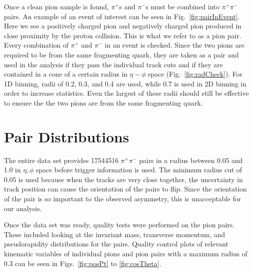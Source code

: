 \documentclass[letterpaper, abstract = on,listof=totoc, bibliography=totoc]{scrreprt}
\begin{document}

Once a clean pion sample is found, $\pi^+$s and $\pi^-$s must be combined into $\pi^+\pi^-$ pairs. An example of an event of interest can be seen in Fig.~\ref{fig:pairInEvent}. Here we see a positively charged pion and negatively charged pion produced in close proximity by the proton collision. This is what we refer to as a pion pair.  Every combination of $\pi^+$ and $\pi^-$ in an event is checked. Since the two pions are required to be from the same fragmenting quark, they are taken as a pair and used in the analysis if they pass the individual track cuts and if they are contained in a cone of a certain radius in $\eta-\phi$ space (Fig.~\ref{fig:radCheck}). For 1D binning, radii of 0.2, 0.3, and 0.4 are used, while 0.7 is used in 2D binning in order to increase statistics. Even the largest of these radii should still be effective to ensure the the two pions are from the same fragmenting quark.  


\FloatBarrier
\section{Pair Distributions}

The entire data set provides 17544516 $\pi^+\pi^-$ pairs in a radius between 0.05 and 1.0 in $\eta,\phi$ space before trigger information is used. The minimum radius cut of 0.05 is used because when the tracks are very close together, the uncertainty in track position can cause the orientation of the pairs to flip. Since the orientation of the pair is so important to the observed asymmetry, this is unacceptable for our analysis. 


Once the data set was ready, quality tests were performed on the pion pairs. These included looking at the invariant mass, transverse momentum, and pseudorapidity distributions for the pairs. Quality control plots of relevant kinematic variables of individual pions and pion pairs with a maximum radius of 0.3 can be seen in Figs.~\ref{fig:posPt} to \ref{fig:cosTheta}. 
\end{document}
